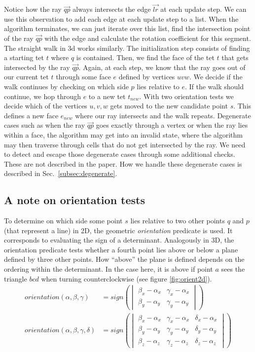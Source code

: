 \documentclass[../thesis.tex]{subfiles}
\begin{document}
Notice how the ray $\vec{qp}$ always intersects the edge $\vec{lr}$ at each update step.
We can use this observation to add each edge at each update step to a list.
When the algorithm terminates, we can just iterate over this list, find
the intersection point of the ray $\vec{qp}$ with the edge and calculate the rotation
coefficient for this segment.
The straight walk in 3d works similarly. The initialization step consists of finding a starting tet $t$
where $q$ is contained. Then, we find the face of the tet $t$ that gets intersected by the ray
$\vec{qp}$. Again, at each step, we know that the ray goes out of our current tet $t$ through some
face $e$ defined by vertices $uvw$. We decide if the walk continues by checking on which side $p$ lies relative to $e$.
If the walk should continue, we hop through $e$ to a new tet $t_{new}$. With two orientation tests
we decide which of the vertices $u, v, w$ gets moved to the new candidate point $s$. This defines
a new face $e_{new}$ where our ray intersects and the walk repeats.
Degenerate cases such as when the ray $\vec{qp}$ goes exactly through a vertex or
when the ray lies within a face, the algorithm may get into
an invalid state, where the algorithm may then traverse through
cells that do not get intersected by the ray. We need to detect and escape those degenerate cases
through some additional checks. These are not described in the paper\cite{Devillers}.
How we handle these degenerate cases is described in Sec.~\ref{subsec:degenerate}.

\subsection{A note on orientation tests}
To determine on which side some point $s$ lies relative to two other points $q$ and $p$ (that represent a line) in 2D, the geometric \emph{orientation} predicate is used.
It corresponds to evaluating the sign of a determinant. Analogously in 3D, the orientation predicate
tests whether a fourth point lies above or below a plane defined by three other points.
How ``above'' the plane is defined depends on the ordering within the determinant. In the case here,
it is above if point $a$ sees the triangle $bcd$ when turning counterclockwise (see figure \ref{fig:orient2d}).
\begin{align*}
  orientation(\alpha, \beta, \gamma) &= 
  sign\left(
  \begin{vmatrix}
    \beta_x -\alpha_x & \gamma_x - \alpha_x \\
    \beta_y -\alpha_y & \gamma_y - \alpha_y 
  \end{vmatrix}\right)
  \\
  orientation(\alpha, \beta, \gamma, \delta) &= 
  sign\left(
  \begin{vmatrix}
    \beta_x -\alpha_x & \gamma_x - \alpha_x & \delta_x - \alpha_x \\
    \beta_y -\alpha_y & \gamma_y - \alpha_y & \delta_y - \alpha_y \\
    \beta_z -\alpha_z & \gamma_z - \alpha_z & \delta_z - \alpha_z
  \end{vmatrix}\right)
\end{align*}
\end{document}
